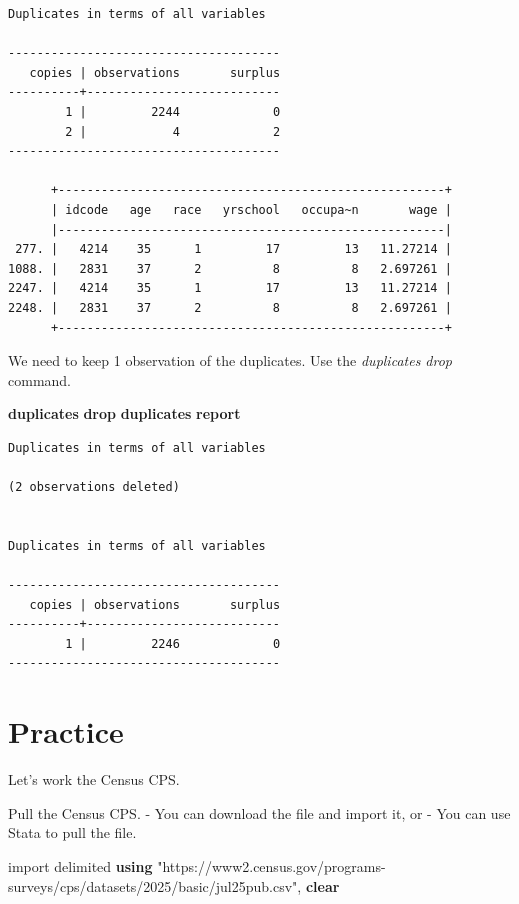 \documentclass[
]{book}
\newenvironment{Shaded}{\begin{snugshade}}{\end{snugshade}}
\newcommand{\KeywordTok}[1]{\textcolor[rgb]{0.13,0.29,0.53}{\textbf{#1}}}
\newcommand{\NormalTok}[1]{#1}
\newcommand{\StringTok}[1]{\textcolor[rgb]{0.31,0.60,0.02}{#1}}
\begin{document}
\begin{verbatim}
Duplicates in terms of all variables

--------------------------------------
   copies | observations       surplus
----------+---------------------------
        1 |         2244             0
        2 |            4             2
--------------------------------------

      +------------------------------------------------------+
      | idcode   age   race   yrschool   occupa~n       wage |
      |------------------------------------------------------|
 277. |   4214    35      1         17         13   11.27214 |
1088. |   2831    37      2          8          8   2.697261 |
2247. |   4214    35      1         17         13   11.27214 |
2248. |   2831    37      2          8          8   2.697261 |
      +------------------------------------------------------+
\end{verbatim}

We need to keep 1 observation of the duplicates. Use the \emph{duplicates drop} command.

\begin{Shaded}
\begin{Highlighting}[]
\KeywordTok{duplicates} \KeywordTok{drop}
\KeywordTok{duplicates} \KeywordTok{report}
\end{Highlighting}
\end{Shaded}

\begin{verbatim}
Duplicates in terms of all variables

(2 observations deleted)


Duplicates in terms of all variables

--------------------------------------
   copies | observations       surplus
----------+---------------------------
        1 |         2246             0
--------------------------------------
\end{verbatim}

\section{Practice}\label{practice}

Let's work the Census CPS.

Pull the Census CPS.
- You can download the file and import it, or
- You can use Stata to pull the file.

\begin{Shaded}
\begin{Highlighting}[]
\NormalTok{import delimited }\KeywordTok{using} \StringTok{"https://www2.census.gov/programs{-}surveys/cps/datasets/2025/basic/jul25pub.csv"}\NormalTok{, }\KeywordTok{clear}
\end{Highlighting}
\end{Shaded}
\end{document}
